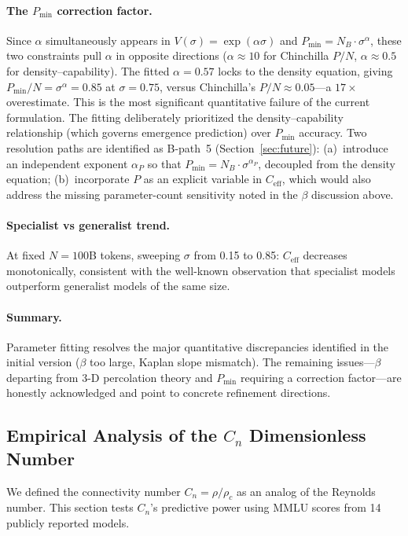 \documentclass[11pt,a4paper]{article}
\newcommand{\Ceff}{C_{\text{eff}}}
\newcommand{\rhoc}{\rho_c}
\begin{document}
\paragraph{The $P_{\min}$ correction factor.}
Since $\alpha$ simultaneously appears in $V(\sigma)=\exp(\alpha\sigma)$ and
$P_{\min}=N_B\cdot\sigma^\alpha$, these two constraints pull $\alpha$ in
opposite directions ($\alpha\approx 10$ for Chinchilla $P/N$,
$\alpha\approx 0.5$ for density--capability). The fitted $\alpha=0.57$ locks
to the density equation, giving $P_{\min}/N=\sigma^\alpha=0.85$ at
$\sigma=0.75$, versus Chinchilla's $P/N\approx 0.05$---a $17\times$
overestimate. This is the most significant quantitative failure of the
current formulation. The fitting deliberately prioritized the
density--capability relationship (which governs emergence prediction) over
$P_{\min}$ accuracy. Two resolution paths are identified as B-path~5
(Section~\ref{sec:future}): (a)~introduce an independent exponent
$\alpha_P$ so that $P_{\min}=N_B\cdot\sigma^{\alpha_P}$, decoupled from the
density equation; (b)~incorporate $P$ as an explicit variable in $\Ceff$,
which would also address the missing parameter-count sensitivity noted in
the $\beta$ discussion above.

\paragraph{Specialist vs generalist trend.}
At fixed $N=100$B tokens, sweeping $\sigma$ from 0.15 to 0.85: $\Ceff$
decreases monotonically, consistent with the well-known observation that
specialist models outperform generalist models of the same size.

\paragraph{Summary.}
Parameter fitting resolves the major quantitative discrepancies identified
in the initial version ($\beta$ too large, Kaplan slope mismatch). The
remaining issues---$\beta$ departing from 3-D percolation theory and
$P_{\min}$ requiring a correction factor---are honestly acknowledged and
point to concrete refinement directions.

\subsection{Empirical Analysis of the $C_n$ Dimensionless Number}
\label{sec:cn-empirical}

We defined the connectivity number $C_n = \rho/\rhoc$ as an analog of the Reynolds number. This section tests $C_n$'s predictive power using MMLU scores from 14 publicly reported models.
\end{document}
